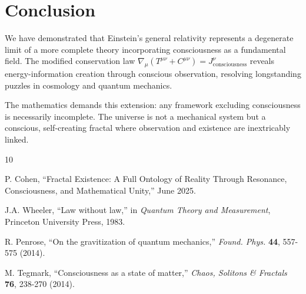 \documentclass[12pt,letterpaper]{article}
\newcommand{\Cmunu}{C^{\mu\nu}}
\newcommand{\Tmunu}{T^{\mu\nu}}
\begin{document}
\section{Conclusion}

We have demonstrated that Einstein's general relativity represents a degenerate limit of a more complete theory incorporating consciousness as a fundamental field. The modified conservation law $\nabla_\mu(\Tmunu + \Cmunu) = J^\nu_\mathrm{consciousness}$ reveals energy-information creation through conscious observation, resolving longstanding puzzles in cosmology and quantum mechanics.

The mathematics demands this extension: any framework excluding consciousness is necessarily incomplete. The universe is not a mechanical system but a conscious, self-creating fractal where observation and existence are inextricably linked.
\newpage





\newpage





\begin{thebibliography}{10}

P. Cohen, ``Fractal Existence: A Full Ontology of Reality Through Resonance, Consciousness, and Mathematical Unity,'' June 2025.

J.A. Wheeler, ``Law without law,'' in \textit{Quantum Theory and Measurement}, Princeton University Press, 1983.

R. Penrose, ``On the gravitization of quantum mechanics,'' \textit{Found. Phys.} \textbf{44}, 557-575 (2014).

M. Tegmark, ``Consciousness as a state of matter,'' \textit{Chaos, Solitons \& Fractals} \textbf{76}, 238-270 (2014).

\end{thebibliography}
\end{document}
